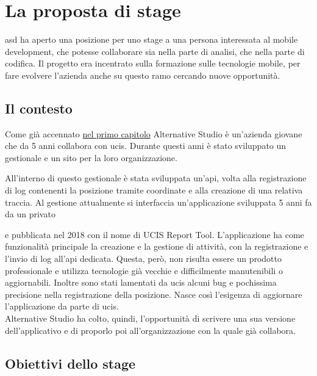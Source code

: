 
\section{La proposta di stage}

\gls{asd} ha aperto una posizione per uno stage a una persona interessata al mobile development, che potesse collaborare sia nella parte di analisi, che nella parte di codifica. Il progetto era incentrato sulla formazione sulle tecnologie mobile, per fare evolvere l'azienda anche su questo ramo cercando nuove opportunità.

\subsection{Il contesto}

Come già accennato {\hyperref[cap:introduzione]{nel primo capitolo}} Alternative Studio è un'azienda giovane che da 5 anni collabora con \gls{ucis}. Durante questi anni è stato sviluppato un gestionale e un sito per la loro organizzazione.


All'interno di questo gestionale è stata sviluppata un'\gls{api}, volta alla registrazione di log contenenti la posizione tramite coordinate e alla creazione di una relativa traccia. Al gestione attualmente si interfaccia un'applicazione sviluppata 5 anni fa da un privato


e pubblicata nel 2018 con il nome di UCIS Report Tool. L'applicazione ha come funzionalità principale la creazione e la gestione di attività, con la registrazione e l'invio di log all'\gls{api} dedicata. Questa, però, non risulta essere un prodotto professionale e utilizza tecnologie già vecchie e difficilmente manutenibili o aggiornabili. Inoltre sono stati lamentati da \gls{ucis} alcuni bug e pochissima precisione nella registrazione della posizione. Nasce così l'esigenza di aggiornare l'applicazione da parte di \gls{ucis}. \\
\noindent Alternative Studio ha colto, quindi, l'opportunità di scrivere una sua versione dell'applicativo e di proporlo poi all'organizzazione con la quale già collabora.

\subsection{Obiettivi dello stage}
\label{sec:obiettivi}

